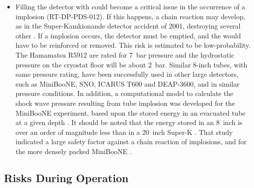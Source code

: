 \begin{itemize}

\item Filling the detector with  could become a critical issue in the occurrence of a  implosion (RT-DP-PDS-012). If this happens, a chain reaction may develop, as in the Super-Kamkionande detector accident of 2001, destroying several other . If a  implosion occurs, the detector must be emptied, and the  would have to be reinforced or removed. This risk is estimated to be low-probability. The Hamamatsu R5912  are rated for \SI{7}{bar} pressure and the hydrostatic pressure on the cryostat floor will be about \SI{2}{bar}. Similar 8-inch tubes, with same pressure rating, have been successfully used in other large detectors, such as MiniBooNE, SNO, ICARUS T600 and DEAP-3600, and in similar pressure conditions. In addition, a computational model to calculate the shock wave pressure resulting from tube implosion was developed for the MiniBooNE experiment, based upon the stored energy in an evacuated tube at a given depth \cite{Brice:2006ny}. It should be noted that the energy stored in an \SI{8}{inch}  is over an order of magnitude less than in a \SI{20}{inch} Super-K . That study indicated a large safety factor against a chain reaction of  implosions, and for the more densely packed MiniBooNE .

\end{itemize}


\subsection{Risks During Operation}
\label{sec:dp-pds-risks_operation}

